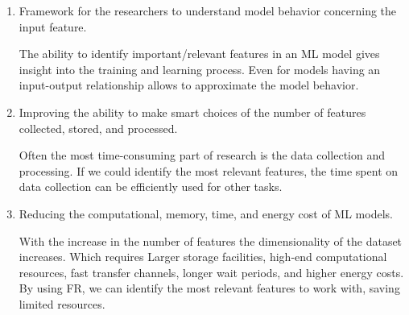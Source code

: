 \begin{enumerate}
    \item Framework for the researchers to understand model behavior concerning the input feature.
    
    The ability to identify important/relevant features in an ML model gives insight into the training and learning process. Even for  models having an input-output relationship allows to approximate the model behavior.
    
    \item Improving the ability to make smart choices of the number of features collected, stored, and processed.
    
    Often the most time-consuming part of research is the data collection and processing. If we could identify the most relevant features, the time spent on data collection can be efficiently used for other tasks.
    
    \item Reducing the computational, memory, time, and energy cost of ML models.
    
    With the increase in the number of features the dimensionality of the dataset increases. Which requires Larger storage facilities, high-end computational resources, fast transfer channels, longer wait periods, and higher energy costs. By using FR, we can identify the most relevant features to work with, saving limited resources.
\end{enumerate}

